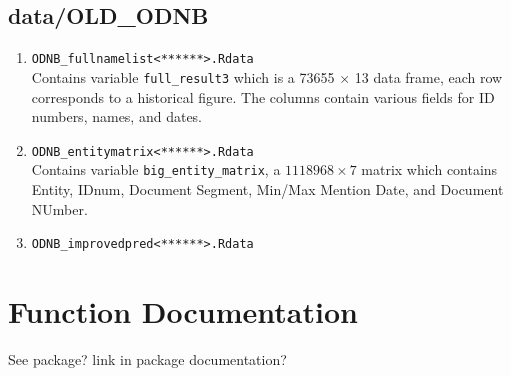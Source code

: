\documentclass[11pt]{article}
\newcommand{\filename}[1]{\texttt{#1}}
\begin{document}
\subsection{data/OLD\_ODNB}
\begin{enumerate}
\item \filename{ODNB\_fullnamelist<******>.Rdata} \\
Contains variable \texttt{full\_result3} which is a 73655 $\times$ 13 data frame, each row corresponds to a historical figure. The columns contain various fields for ID numbers, names, and dates. 

\item \filename{ODNB\_entitymatrix<******>.Rdata} \\
Contains variable \texttt{big\_entity\_matrix}, a $1118968 \times 7$ matrix which contains Entity, IDnum, Document Segment, Min/Max Mention Date, and Document NUmber. 

\item \filename{ODNB\_improvedpred<******>.Rdata} \\

\end{enumerate}


\section{Function Documentation}
See package? link in package documentation?
\end{document}
